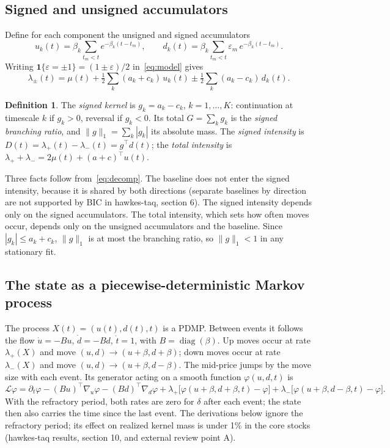 \documentclass[11pt]{article}
\theoremstyle{definition}
\newtheorem*{definition}{Definition}
\theoremstyle{remark}
\newcommand{\one}{\mathbf{1}}
\begin{document}
\subsection{Signed and unsigned accumulators}

Define for each component the unsigned and signed accumulators
\[
u_k(t) = \beta_k \sum_{t_m < t} e^{-\beta_k (t - t_m)}, \qquad d_k(t) = \beta_k \sum_{t_m < t} \varepsilon_m\, e^{-\beta_k (t - t_m)} .
\]
Writing $\one\{\varepsilon = \pm 1\} = (1 \pm \varepsilon)/2$ in~\eqref{eq:model} gives
\begin{equation}
\lambda_\pm(t) = \mu(t) + \tfrac12 \sum_k (a_k + c_k)\, u_k(t) \pm \tfrac12 \sum_k (a_k - c_k)\, d_k(t) .
\label{eq:decomp}
\end{equation}

\begin{definition}
The \emph{signed kernel} is $g_k = a_k - c_k$, $k = 1, \dots, K$: continuation at timescale $k$ if $g_k > 0$, reversal if $g_k < 0$. Its total $G = \sum_k g_k$ is the \emph{signed branching ratio}, and $\|g\|_1 = \sum_k |g_k|$ its absolute mass. The \emph{signed intensity} is $D(t) = \lambda_+(t) - \lambda_-(t) = g^\top d(t)$; the \emph{total intensity} is $\lambda_+ + \lambda_- = 2\mu(t) + (a + c)^\top u(t)$.
\end{definition}

Three facts follow from~\eqref{eq:decomp}. The baseline does not enter the signed intensity, because it is shared by both directions (separate baselines by direction are not supported by BIC in hawkes-taq, section 6). The signed intensity depends only on the signed accumulators. The total intensity, which sets how often moves occur, depends only on the unsigned accumulators and the baseline. Since $|g_k| \le a_k + c_k$, $\|g\|_1$ is at most the branching ratio, so $\|g\|_1 < 1$ in any stationary fit.

\subsection{The state as a piecewise-deterministic Markov process}

The process $X(t) = (u(t), d(t), t)$ is a PDMP. Between events it follows the flow $\dot u = -Bu$, $\dot d = -Bd$, $\dot t = 1$, with $B = \operatorname{diag}(\beta)$. Up moves occur at rate $\lambda_+(X)$ and move $(u, d) \to (u + \beta, d + \beta)$; down moves occur at rate $\lambda_-(X)$ and move $(u, d) \to (u + \beta, d - \beta)$. The mid-price jumps by the move size with each event. Its generator acting on a smooth function $\varphi(u, d, t)$ is
\[
\mathcal L \varphi = \partial_t \varphi - (Bu)^\top \nabla_u \varphi - (Bd)^\top \nabla_d \varphi + \lambda_+ \big[\varphi(u + \beta, d + \beta, t) - \varphi\big] + \lambda_- \big[\varphi(u + \beta, d - \beta, t) - \varphi\big] .
\]
With the refractory period, both rates are zero for $\delta$ after each event; the state then also carries the time since the last event. The derivations below ignore the refractory period; its effect on realized kernel mass is under 1\% in the core stocks (hawkes-taq results, section 10, and external review point A).
\end{document}
